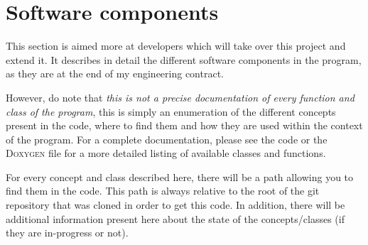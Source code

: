 \chapter{Software components}\label{text:03_software_components}

\begin{comment}
	What are the major software components of the program, what is(are) their role(s)
		- Image representation in memory
			- Old way : DiscreteGrid
			- New way : Grid<ImageBackendImpl>
		- Visualization primitives
			- Viewers : 3D and 2D
			- Scene
			- The different components of the scene, more detailed
		- Generation primitives
		- Tasks / multi-threaded stuff
		- General purpose / other things that didn't fit into above
\end{comment}

This section is aimed more at developers which will take over this project and extend it. It describes in detail the different software components in the program, as they are at the end of my engineering contract.

However, do note that \textit{this is not a precise documentation of every function and class of the program}, this is simply an enumeration of the different concepts present in the code, where to find them and how they are used within the context of the program. For a complete documentation, please see the code or the \textsc{Doxygen} file for a more detailed listing of available classes and functions.

For every concept and class described here, there will be a path allowing you to find them in the code. This path is always relative to the root of the git repository that was cloned in order to get this code. In addition, there will be additional information present here about the state of the concepts/classes (if they are in-progress or not).

